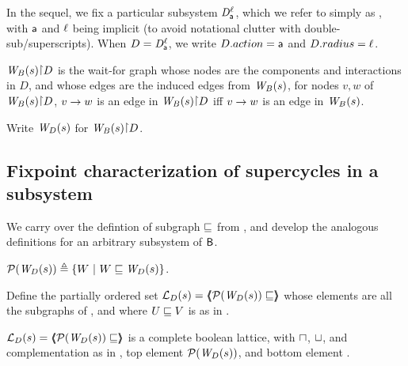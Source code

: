 In the sequel, we fix a particular subsystem $\dsk{\act}{\l}$, which
we refer to simply as \DS, with $\act$ and $\l$ being implicit (to
avoid notational clutter with double-sub/superscripts). 
When $\DS = \dsk{\act}{\l}$, we write $\DS.action = \act$ and
$\DS.radius = \l$. 


\begin{definition} \label{defn:projWgraph}
$\wfg{B}{s} \pj \DS$ is the wait-for graph whose nodes are the
components and interactions in $D$, and whose edges are the induced
edges from $\wfg{B}{s}$, \ie for nodes $v, w$ of $\wfg{B}{s} \pj \DS$,
$v \ar w$ is an edge in $\wfg{B}{s} \pj \DS$ iff $v \ar w$ is an edge in $\wfg{B}{s}$.

Write $\lwfg{B}{s}{\DS}$ for $\wfg{B}{s} \pj \DS$.
\end{definition}


%
\subsection{Fixpoint characterization of  supercycles in a  subsystem}

\label{s:local.fixpoint}

We carry over the defintion of subgraph $\subg$ from , and develop the analogous definitions for an arbitrary subsystem of $\B$.


\begin{definition} \label{defn:wsetOfSubgraphsLoc}
$\lwfgS{B}{s}{\DS} \df  \set{ W \stt W \subg \lwfg{B}{s}{\DS} }$.
\end{definition}

\begin{definition} \label{defn:wflatticeLoc}
Define the partially ordered set 
$\llat{\B}{s}{\DS}  = \tpl{ \lwfgS{B}{s}{\DS}  \subg }$ 
whose elements are all the subgraphs of 
, and where  $U \subg V$ is as in .   
\end{definition}

\begin{proposition} \label{prop:isALatticeLoc}
$\llat{\B}{s}{\DS}  = \tpl{ \lwfgS{B}{s}{\DS}  \subg }$
 is a complete boolean lattice, with $\meet$, $\join$, and complementation as in 
, top element $\lwfgS{B}{s}{\DS}$, and bottom element \ewfg.
\end{proposition}

